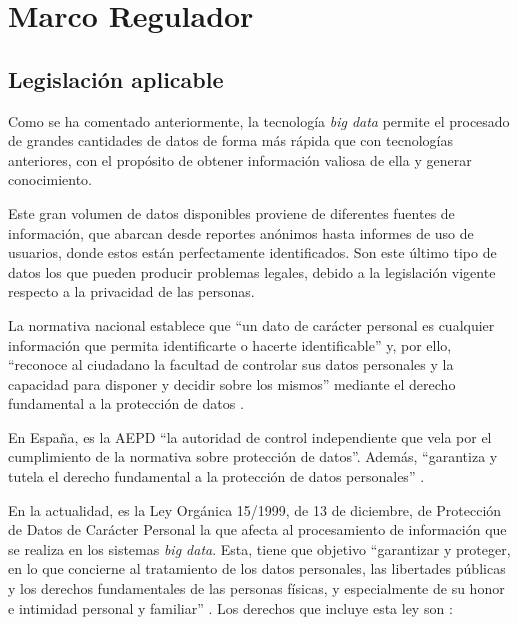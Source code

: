 \chapter{Marco Regulador \label{sec:MarcoRegulador}}

\section{Legislación aplicable}
Como se ha comentado anteriormente, la tecnología \textit{big data} permite el procesado de grandes cantidades de datos de forma más rápida que con tecnologías anteriores, con el propósito de obtener información valiosa de ella y generar conocimiento.

Este gran volumen de datos disponibles proviene de diferentes fuentes de información, que abarcan desde reportes anónimos hasta informes de uso de usuarios, donde estos están perfectamente identificados. Son este último tipo de datos los que pueden producir problemas legales, debido a la legislación vigente respecto a la privacidad de las personas.

La normativa nacional establece que ``un dato de carácter personal es cualquier información que permita identificarte o hacerte identificable'' y, por ello, ``reconoce al ciudadano la facultad de controlar sus datos personales y la capacidad para disponer y decidir sobre los mismos'' mediante el derecho fundamental a la protección de datos \cite{aepd}.

En España, es la \gls{AEPD} ``la autoridad de control independiente que vela por el cumplimiento de la normativa sobre protección de datos''. Además, ``garantiza y tutela el derecho fundamental a la protección de datos personales'' \cite{aepd}.

En la actualidad, es la Ley Orgánica 15/1999, de 13 de diciembre, de Protección de Datos de Carácter Personal \cite{leyPrivacidad} la que afecta al procesamiento de información que se realiza en los sistemas \textit{big data}. Esta, tiene que objetivo ``garantizar
y  proteger,  en  lo  que  concierne  al  tratamiento  de  los
datos personales, las libertades públicas y los derechos
fundamentales de las personas físicas, y especialmente
de su honor e intimidad personal y familiar'' \cite{leyPrivacidad}. Los derechos que incluye esta ley son \cite{derechosCiu}:

